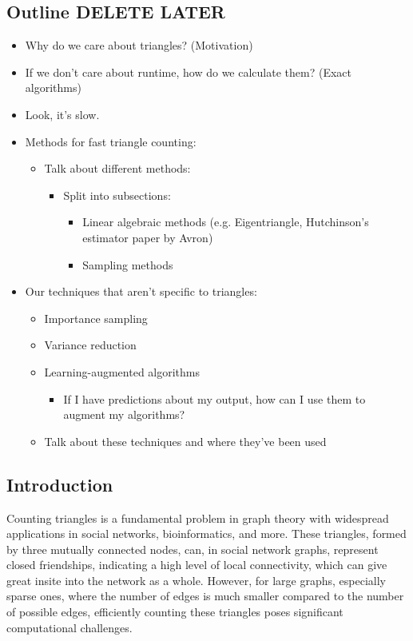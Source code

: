 \documentclass[12pt]{article}
\begin{document}
\subsection{Outline DELETE LATER}
\begin{itemize}
    \item Why do we care about triangles? (Motivation)
    \item If we don't care about runtime, how do we calculate them? (Exact algorithms)
    \item Look, it's slow.
    \item Methods for fast triangle counting:
    \begin{itemize}
        \item Talk about different methods:
        \begin{itemize}
            \item Split into subsections:
            \begin{itemize}
                \item Linear algebraic methods (e.g. Eigentriangle, Hutchinson's estimator paper by Avron)
                \item Sampling methods
            \end{itemize}
        \end{itemize}
    \end{itemize}
    \item Our techniques that aren't specific to triangles:
    \begin{itemize}
        \item Importance sampling
        \item Variance reduction
        \item Learning-augmented algorithms
        \begin{itemize}
            \item If I have predictions about my output, how can I use them to augment my algorithms?
        \end{itemize}
        \item Talk about these techniques and where they've been used
    \end{itemize}
\end{itemize}

\subsection{Introduction}

Counting triangles is a fundamental problem in graph theory with widespread applications in social networks, bioinformatics, and more.
These triangles, formed by three mutually connected nodes, can, in social network graphs, represent closed friendships, indicating a high level of local connectivity, which can give great insite into the network as a whole.
However, for large graphs, especially sparse ones, where the number of edges is much smaller compared to the number of possible edges, efficiently counting these triangles poses significant computational challenges.
\end{document}
